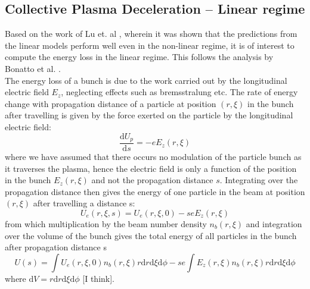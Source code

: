 \subsection{Collective Plasma Deceleration -- Linear regime }
Based on the work of Lu et. al \citep{Lu2006}, wherein it was shown that the predictions from the linear models perform well even in the non-linear regime, it is of interest to compute the energy loss in the linear regime. This follows the analysis by Bonatto et al. \citep{Bonatto2016}.\\
The energy loss of a bunch is due to the work carried out by the longitudinal electric field $E_z$, neglecting effects such as bremsstralung etc. The rate of energy change with propagation distance of a particle at position $(r,\xi)$ in the bunch after travelling is given by the force exerted on the particle by the longitudinal electric field:
\begin{equation}
\frac{\mathrm{d}U_p}{\mathrm{d}s}=-eE_z(r,\xi)
\end{equation}
where we have assumed that there occurs no modulation of the particle bunch as it traverses the plasma, hence the electric field is only a function of the position in the bunch $E_z(r,\xi)$ and not the propagation distance $s$. Integrating over the propagation distance then gives the energy of one particle in the beam at position $(r,\xi)$ after travelling a distance s:
\begin{equation}
U_e(r,\xi,s)=U_e(r,\xi,0)-seE_z(r,\xi)
\end{equation}
from which multiplication by the beam number density $n_b(r,\xi)$ and integration over the volume of the bunch gives the total energy of all particles in the bunch after propagation distance s
\begin{equation}
U(s)=\int  U_e(r,\xi,0)n_b(r,\xi)r\mathrm{d}r\mathrm{d}\xi\mathrm{d}\phi-se\int E_z(r,\xi)n_b(r,\xi)r\mathrm{d}r\mathrm{d}\xi\mathrm{d}\phi
\end{equation}
where $\mathrm{d}V=r\mathrm{d}r\mathrm{d}\xi\mathrm{d}\phi$ [I think].
